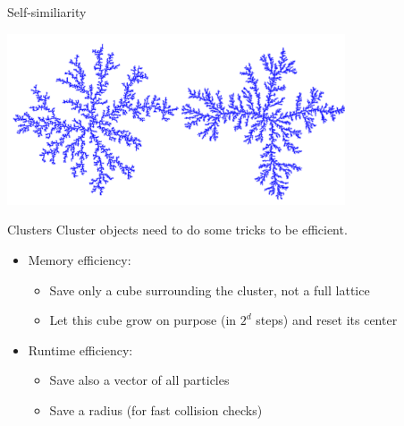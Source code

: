 \documentclass[smaller]{beamer}
\begin{document}
        \begin{frame}{Self-similiarity}
            \begin{center}
                \includegraphics[width=10cm]{img/app_02.png}
            \end{center}
        \end{frame}
\begin{frame}{Clusters}
  Cluster objects need to do some tricks to be efficient. \vspace{0.3cm}\pause
  \begin{itemize}
    \item Memory efficiency: \pause
      \begin{itemize}
        \item Save only a cube surrounding the cluster, not a full lattice
          \pause
        \item Let this cube grow on purpose (in $2^d$ steps)
          and reset its center
      \end{itemize} \pause
      \vspace{0.3cm}
    \item Runtime efficiency: \pause
      \begin{itemize}
        \item Save also a vector of all particles \pause
        \item Save a radius (for fast collision checks) \pause
      \end{itemize}
  \end{itemize}
\end{frame}
\end{document}
